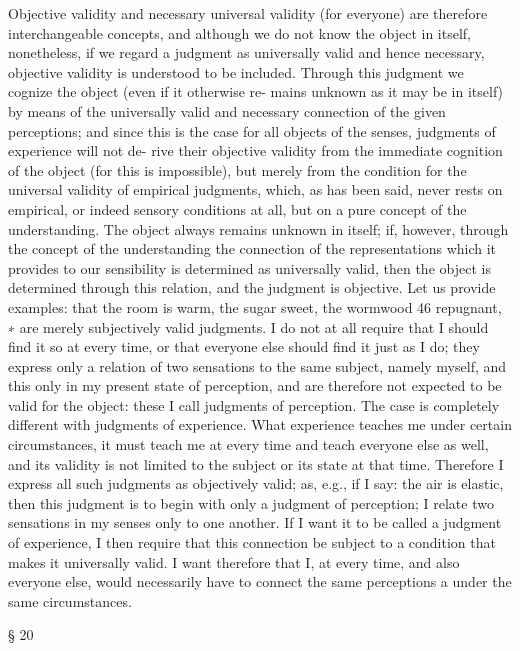 Objective validity and necessary universal validity (for everyone) are
therefore interchangeable concepts, and although we do not know the
object in itself, nonetheless, if we regard a judgment as universally valid
and hence necessary, objective validity is understood to be included.
Through this judgment we cognize the object (even if it otherwise re-
mains unknown as it may be in itself) by means of the universally valid
and necessary connection of the given perceptions; and since this is the
case for all objects of the senses, judgments of experience will not de-
rive their objective validity from the immediate cognition of the object
(for this is impossible), but merely from the condition for the universal
validity of empirical judgments, which, as has been said, never rests on
empirical, or indeed sensory conditions at all, but on a pure concept
of the understanding. The object always remains unknown in itself; if,
however, through the concept of the understanding the connection of
the representations which it provides to our sensibility is determined as
universally valid, then the object is determined through this relation, and
the judgment is objective.
Let us provide examples: that the room is warm, the sugar sweet,
the wormwood 46 repugnant, ∗ are merely subjectively valid judgments.
I do not at all require that I should ﬁnd it so at every time, or that
everyone else should ﬁnd it just as I do; they express only a relation of
two sensations to the same subject, namely myself, and this only in my
present state of perception, and are therefore not expected to be valid for
the object: these I call judgments of perception. The case is completely
different with judgments of experience. What experience teaches me
under certain circumstances, it must teach me at every time and teach
everyone else as well, and its validity is not limited to the subject or its
state at that time. Therefore I express all such judgments as objectively
valid; as, e.g., if I say: the air is elastic, then this judgment is to begin
with only a judgment of perception; I relate two sensations in my senses
only to one another. If I want it to be called a judgment of experience, I
then require that this connection be subject to a condition that makes it
universally valid. I want therefore that I, at every time, and also everyone
else, would necessarily have to connect the same perceptions a under the
same circumstances.

§ 20

